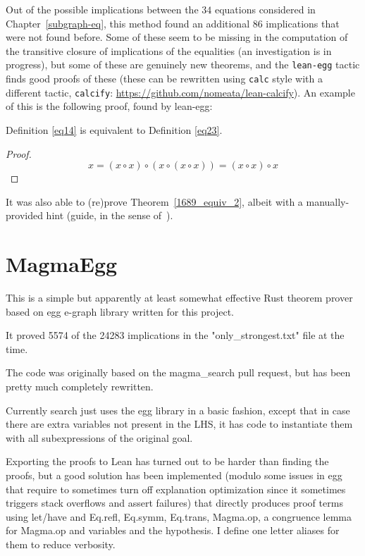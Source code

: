 Out of the possible implications between the $34$ equations considered in Chapter~\ref{subgraph-eq}, this method found an additional 86 implications that were not found before.
Some of these seem to be missing in the computation of the transitive closure of implications of the equalities (an investigation is in progress), but some of these are genuinely new theorems, and the \texttt{lean-egg} tactic finds good proofs of these (these can be rewritten using \texttt{calc} style with a different tactic, \texttt{calcify}: \url{https://github.com/nomeata/lean-calcify}). An example of this is the following proof, found by lean-egg:

\begin{theorem}[14 implies 23]\label{14_implies_23} \leanok  Definition \ref{eq14} is equivalent to Definition \ref{eq23}.
\end{theorem}

\begin{proof}

$$ x = (x \circ x) \circ (x \circ (x \circ x)) = (x \circ x) \circ x $$
\end{proof}

It was also able to (re)prove Theorem~\ref{1689_equiv_2}, albeit with a manually-provided hint (guide, in the sense of~\cite{DBLP:journals/pacmpl/KoehlerGBGTS24}).

\section{MagmaEgg}

This is a simple but apparently at least somewhat effective Rust theorem prover based on egg e-graph library written for this project.

It proved 5574 of the 24283 implications in the "only\_strongest.txt" file at the time.

The code was originally based on the magma\_search pull request, but has been pretty much completely rewritten.

Currently search just uses the egg library in a basic fashion, except that in case there are extra variables not present in the LHS, it has code to instantiate them with all subexpressions of the original goal.

Exporting the proofs to Lean has turned out to be harder than finding the proofs, but a good solution has been implemented (modulo some issues in egg that require to sometimes turn off explanation optimization since it sometimes triggers stack overflows and assert failures) that directly produces proof terms using let/have and Eq.refl, Eq.symm, Eq.trans, Magma.op, a congruence lemma for Magma.op and variables and the hypothesis. I define one letter aliases for them to reduce verbosity.

